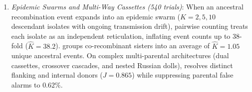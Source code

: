 \begin{enumerate}
    \item \textit{Epidemic Swarms and Multi-Way Cassettes (540 trials)}:
    When an ancestral recombination event expands into an epidemic swarm ($K = 2, 5, 10$ descendant isolates with ongoing transmission drift), pairwise counting treats each isolate as an independent reticulation, inflating event counts up to 38-fold ($\hat{K} = 38.2$). \RhizAeon groups co-recombinant sisters into an average of $\hat{K} = 1.05$ unique ancestral events. On complex multi-parental architectures (dual cassettes, crossover cascades, and nested Russian dolls), \RhizAeon resolves distinct flanking and internal donors ($J = 0.865$) while suppressing parental false alarms to $0.62\%$.
\end{enumerate}
